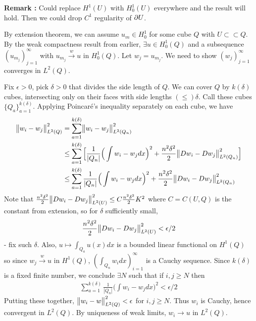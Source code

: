 \documentclass[10pt,a4paper]{report}
\newenvironment{proof}
{\begin{changemargin}{1cm}{0.5cm} 
	}%
	{\end{changemargin}
}
\begin{document}
\textbf{Remark :} Could replace $H^1(U)$ with $H_0^1(U)$ everywhere and the result will hold. Then we could drop $C^1$ regularity of $\partial U$. 
\begin{proof}
\pf By extension theorem, we can assume $u_m \in H_0^1$ for some cube $Q$ with $U \subset \subset Q$. By the weak compactness result from earlier, $\exists u\in H_0^1(Q)$ and a subsequence $(u_{m_j})_{j=1}^{\infty}$ with $u_{m_j} \xrightarrow{w} u$ in $H_0^1(Q)$. Let $w_j = u_{m_j}$. We need to show $(w_j)_{j=1}^{\infty}$ converges in $L^2(Q)$.

\quad Fix $\epsilon >0$, pick $\delta >0$ that divides the side length of $Q$. We can cover $Q$ by $k(\delta)$ cubes, intersecting only on their faces with side lengths $(\leq)\delta$. Call these cubes $\{Q_a \}_{a=1}^{k(\delta)}$. Applying Poincar\'{e}'s inequality separately on each cube, we have
\begin{align*}
\bigl\lVert w_i - w_j\bigr\rVert_{L^2(Q)}^2 &= \sum_{a=1}^{k(\delta)} \bigl\lVert w_i -w_j\bigr\rVert_{L^2(Q_n)}^2 \\
& \leq  \sum_{a=1}^{k(\delta)} \Big[ \frac{1}{|Q_n|} \Big( \int w_i - w_j dx\Big)^2 + \frac{n^2 \delta^2}{2} \bigl\lVert Dw_i -Dw_j\bigr\rVert_{L^2(Q_n)}^2\Big] \\
& \leq \sum_{a=1}^{k(\delta)} \frac{1}{|Q_n|} \Big( \int w_i - w_j dx\Big)^2 + \frac{n^2 \delta^2}{2} \bigl\lVert Dw_i -Dw_j\bigr\rVert_{L^2(Q_n)}^2
\end{align*}
Note that $\frac{n^2 \delta^2}{2} \bigl\lVert Dw_i - Dw_j\bigr\rVert_{L^2(U)}^2 \leq C \frac{n^2\delta^2}{2} K^2$ where $C = C(U,Q)$ is the constant from extension, so for $\delta$ sufficiently small, 
\begin{align*}
\frac{n^2 \delta^2}{2}\bigl\lVert Dw_i - Dw_j\bigr\rVert_{L^2(U)}^2 < \epsilon/2
\end{align*}
- fix such $\delta$. Also, $u \mapsto \int_{Q_a} u(x)dx$ is a bounded linear functional on $H^1(Q)$ so since $w_j \xrightarrow{w} u$ in $H^1(Q)$, $(\int_{Q_n} w_i dx)_{i=1}^{\infty}$ is a Cauchy sequence. Since $k(\delta)$ is a fixed finite number, we conclude $\exists N$ such that if $i,j\geq N$ then
\begin{align*}
\sum_{a=1}^{k(\delta)} \frac{1}{|Q_n|} \Big( \int w_i - w_j dx\Big)^2 < \epsilon/2
\end{align*}
Putting these together, $\bigl\lVert w_i -w\bigr\rVert_{L^2(Q)}^2 < \epsilon$ for $i,j\geq N$. Thus $w_i$ is Cauchy, hence convergent in $L^2(Q)$. By uniqueness of weak limits, $w_i \rightarrow u$ in $L^2(Q)$.

\eop
\end{proof}
\end{document}
